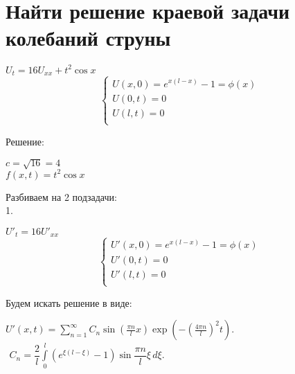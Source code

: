 \documentclass{article}
\begin{document}
    \section{Найти решение краевой задачи колебаний струны}
    \begin{center}
        $ U_{t} = 16U_{xx} + t^2 \cos x $ \\
        \begin{equation*}
            \begin{cases}
                U(x, 0) = e^{x(l-x)} - 1 = \phi(x) \\
                U(0, t) = 0  \\
                U(l, t) = 0  \\
            \end{cases}
		\end{equation*}
    \end{center}
    Решение: \\
    \begin{center}
        $ c = \sqrt{16} = 4 $ \\
        $ f(x, t) = t^2 \cos x $ \\
    \end{center}
    Разбиваем на 2 подзадачи: \\
    1.
    \begin{center}
        $ U'_{t} = 16U'_{xx} $ \\
        \begin{equation*}
            \begin{cases}
                U'(x, 0) = e^{x(l-x)} - 1 = \phi(x) \\
                U'(0, t) = 0 \\
                U'(l, t) = 0 \\
            \end{cases}
		\end{equation*}
    \end{center}
    Будем искать решение в виде: \\
    \begin{center}
        $ U'(x, t)=\sum \limits _{{n=1}}^{\infty }C_{n}\sin \left({\frac  {\pi n}{l}}x\right)\exp \left(-\left({\frac  {4 \pi n}{l}}\right)^{2}t\right). $ \\
        $ {\begin{array}{l} C_{n}={\dfrac  {2}{l}}\displaystyle \int \limits _{0}^{l} (e^{\xi(l-\xi)} - 1)  \sin {\dfrac  {\pi n}{l}}\xi \,d\xi .\end{array}} $
    \end{center}
\end{document}
